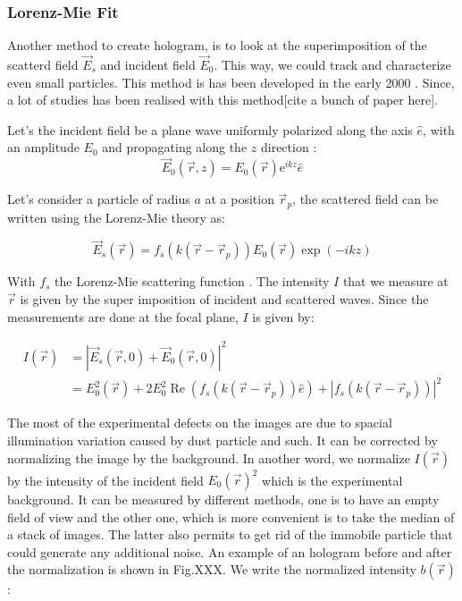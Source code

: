 \subsubsection{Lorenz-Mie Fit}

Another method to create hologram, is to look at the superimposition of the scatterd field $\vec{E}_s$ and incident field $\vec{E}_0$. This way, we could track and characterize even small particles. This method is has been developed in the early 2000 \cite{ovryn_imaging_2000, lee_characterizing_2007}. Since, a lot of studies has been realised with this method[cite a bunch of paper here]. 

Let's the incident field be a plane wave uniformly polarized along the axis $ \hat{e}$, with an amplitude $E_0$ and propagating along the $z$ direction :
\begin{equation}
	\vec{E}_0(\vec{r},z) = E_0(\vec{r}) \mathrm{e}^{ikz}\hat{e}
\end{equation}

Let's consider a particle of radius $a$ at a position $\vec{r}_p $, the scattered field can be written using the Lorenz-Mie theory \cite{f_bohren_absorption_1998} as:

\begin{equation}
	\vec{E}_s(\vec{r}) =  f_s(k(\vec{r} - \vec{r}_p))E_0(\vec{r}) \exp \left(-ikz\right) 
\end{equation} 

With $f_s$ the Lorenz-Mie scattering function \cite{f_bohren_absorption_1998}. The intensity $I$ that we measure at $\vec{r}$ is given by the super imposition of incident and scattered waves. Since the measurements are done at the focal plane, $I$ is given by:

\begin{equation}
	\begin{aligned}
	I(\vec{r}) & = |\vec{E}_s(\vec{r}, 0) + \vec{E}_0(\vec{r}, 0)|^2 \\
	& = E_0^2(\vec{r}) + 2 E_0^2\operatorname{Re} \left(f_s(k(\vec{r}- \vec{r}_p)) \hat{e}\right) + | f_s(k(\vec{r}- \vec{r}_p)) |^2
	\end{aligned}
\end{equation}

The most of the experimental defects on the images are due to spacial illumination variation caused by dust particle and such. It can be corrected by normalizing the image by the background. In another word, we normalize  $I(\vec{r})$ by the intensity of the incident field $E_0(\vec{r})^2$ which is the experimental background. It can be measured by different methods, one is to have an empty field of view and the other one, which is more convenient is to take the median of a stack of images. The latter also permits to get rid of the immobile particle that could generate any additional noise. An example of an hologram before and after the normalization is shown in Fig.XXX. We write the normalized intensity $b(\vec{r})$:

